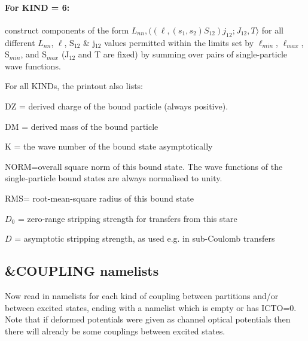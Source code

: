 \documentclass[11pt]{article}
\begin{document}
\paragraph{For KIND = 6:} construct components of the form
$
              L_{nn}, ((\ell, (s_1,s_2)S_{12})j_{12}; J_{12},T\rangle
$
for all different $L_{nn}$, $\ell$, S$_{12}$ \& j$_{12}$ values permitted within the
limits set by $\ell_{min}$, $\ell_{max}$, S$_{min}$, and S$_{max}$
(J$_{12}$ and T are fixed)
by summing over pairs of single-particle wave functions.

\noindent
For all KINDs, the printout also lists:

DZ = derived charge of the bound particle (always positive).

DM = derived mass of the bound particle

K  = the wave number of the bound state asymptotically

NORM=overall square norm of this bound state.
The wave functions of the single-particle bound states are always
normalised to unity.

RMS= root-mean-square radius of this bound state

$D_{0}$ = zero-range stripping strength for transfers from this stare

$D$  = asymptotic stripping strength, as used e.g. in sub-Coulomb
transfers

\subsection{\&COUPLING namelists}
%
Now read in namelists for each kind of coupling between partitions
and/or between excited states, ending with a namelist which is empty or has ICTO=0.
Note that if deformed potentials were given as channel optical
potentials then there will already be some couplings between
excited states.
\end{document}
